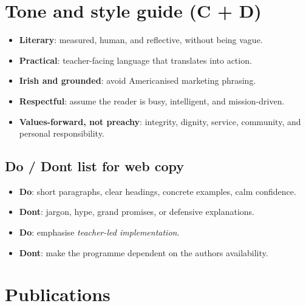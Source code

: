 \documentclass[11pt,a4paper]{article}
\renewcommand{\emoji}[1]{}
\begin{document}
\section{Tone and style guide (C + D)}

\begin{tcolorbox}[
  colback=white,
  colframe=blue!50!black,
  opacityframe=0.5,
  fonttitle=\bfseries\color{white},
  title={\emoji{brain} Non-Cognitive Skills --- Voice and tone},
  drop shadow
]
\begin{itemize}
  \item \textbf{Literary}: measured, human, and reflective, without being vague.
  \item \textbf{Practical}: teacher-facing language that translates into action.
  \item \textbf{Irish and grounded}: avoid Americanised marketing phrasing.
  \item \textbf{Respectful}: assume the reader is busy, intelligent, and mission-driven.
  \item \textbf{Values-forward, not preachy}: integrity, dignity, service, community, and personal responsibility.
\end{itemize}
\end{tcolorbox}

\subsection{Do / Don\textquotesingle t list for web copy}

\begin{itemize}
  \item \textbf{Do}: short paragraphs, clear headings, concrete examples, calm confidence.
  \item \textbf{Don\textquotesingle t}: jargon, hype, grand promises, or defensive explanations.
  \item \textbf{Do}: emphasise \textit{teacher-led implementation}.
  \item \textbf{Don\textquotesingle t}: make the programme dependent on the author\textquotesingle s availability.
\end{itemize}

\section{Publications}
\end{document}
